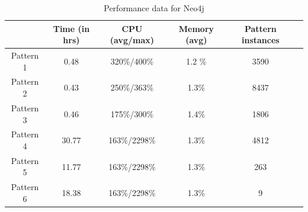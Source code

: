 \begin{table}[h]{}
\begin{center}
\begin{tabular}{|c|c|c|c|c|c|}
\hline
 & Time (in hrs) & CPU (avg/max) & Memory (avg) & Pattern instances\\
\hline
Pattern	1 	& 0.48  &    320\%/400\%	&   1.2 \% & 3590 \\
Pattern	2 	& 0.43  &    250\%/363\%	&   1.3\%	&  8437 \\
Pattern	3 	& 0.46  &    175\%/300\%	&	1.4\%  & 1806\\
Pattern	4 	& 30.77 &    163\%/2298\%	&	1.3\%  & 4812  \\
Pattern	5 	& 11.77 &    163\%/2298\%	&	1.3\%  & 263 \\
Pattern	6 	& 18.38 &    163\%/2298\%	&	1.3\%  & 9 \\

\hline
\end{tabular}
\caption{ Performance data for Neo4j}
\label{table:neo4j}
\label{table:orientdb-per thread}
\end{center}
\end{table}

